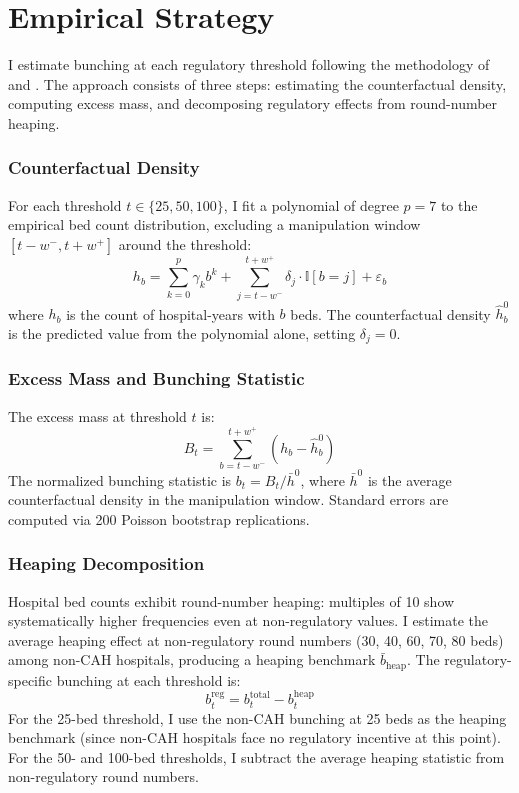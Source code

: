 \documentclass[12pt]{article}
\newcommand{\ind}{\mathbb{I}}
\begin{document}
\section{Empirical Strategy}

I estimate bunching at each regulatory threshold following the methodology of \citet{Kleven2016} and \citet{Saez2010}. The approach consists of three steps: estimating the counterfactual density, computing excess mass, and decomposing regulatory effects from round-number heaping.

\subsubsection*{Counterfactual Density} For each threshold $t \in \{25, 50, 100\}$, I fit a polynomial of degree $p = 7$ to the empirical bed count distribution, excluding a manipulation window $[t - w^{-}, t + w^{+}]$ around the threshold:
\begin{equation}
h_b = \sum_{k=0}^{p} \gamma_k b^k + \sum_{j = t - w^{-}}^{t + w^{+}} \delta_j \cdot \ind[b = j] + \varepsilon_b
\end{equation}
where $h_b$ is the count of hospital-years with $b$ beds. The counterfactual density $\hat{h}_b^0$ is the predicted value from the polynomial alone, setting $\delta_j = 0$.

\subsubsection*{Excess Mass and Bunching Statistic} The excess mass at threshold $t$ is:
\begin{equation}
B_t = \sum_{b = t - w^{-}}^{t + w^{+}} (h_b - \hat{h}_b^0)
\end{equation}
The normalized bunching statistic is $b_t = B_t / \bar{h}^0$, where $\bar{h}^0$ is the average counterfactual density in the manipulation window. Standard errors are computed via 200 Poisson bootstrap replications.

\subsubsection*{Heaping Decomposition} Hospital bed counts exhibit round-number heaping: multiples of 10 show systematically higher frequencies even at non-regulatory values. I estimate the average heaping effect at non-regulatory round numbers (30, 40, 60, 70, 80 beds) among non-CAH hospitals, producing a heaping benchmark $\bar{b}_{\text{heap}}$. The regulatory-specific bunching at each threshold is:
\begin{equation}
b_t^{\text{reg}} = b_t^{\text{total}} - b_t^{\text{heap}}
\end{equation}
For the 25-bed threshold, I use the non-CAH bunching at 25 beds as the heaping benchmark (since non-CAH hospitals face no regulatory incentive at this point). For the 50- and 100-bed thresholds, I subtract the average heaping statistic from non-regulatory round numbers.
\end{document}
